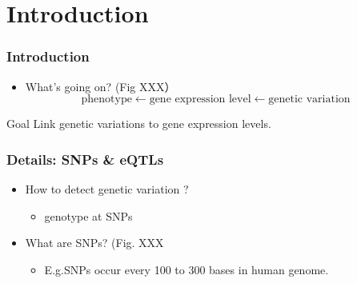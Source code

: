 \section{Introduction}
\begin{frame}
\sectionpage
\end{frame}

\begin{frame}
    \frametitle{Introduction}
    \begin{itemize}
      \item What's going on? (Fig XXX） 
      \begin{equation*}
        \text{phenotype} \leftarrow 
        \text{gene expression level} \leftarrow 
        \text{genetic variation }
      \end{equation*}
	\end{itemize}

%      
	\begin{block}{Goal}
		Link genetic variations to gene expression levels.
	\end{block}

    
\end{frame}

\begin{frame}
	\frametitle{Details: SNPs \& eQTLs}
	\begin{itemize}
		\item How to detect genetic variation ?
		\begin{itemize}
			\item genotype at SNPs
		\end{itemize}
		\item What are SNPs? (Fig. XXX
		\begin{itemize}
			\item E.g.SNPs occur every 100 to 300 bases in human genome.
		\end{itemize}
		
	\end{itemize}
\end{frame}

